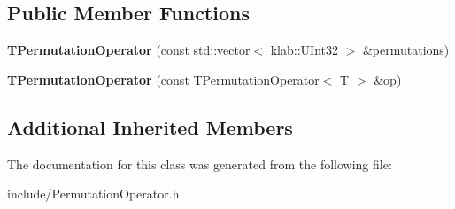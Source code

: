 \subsection*{Public Member Functions}
\begin{DoxyCompactItemize}
\item 
{\bfseries T\+Permutation\+Operator} (const std\+::vector$<$ klab\+::\+U\+Int32 $>$ \&permutations)\hypertarget{classkl1p_1_1TPermutationOperator_a6bd03c0b4d4ed3b6764846d3b71384c3}{}\label{classkl1p_1_1TPermutationOperator_a6bd03c0b4d4ed3b6764846d3b71384c3}

\item 
{\bfseries T\+Permutation\+Operator} (const \hyperlink{classkl1p_1_1TPermutationOperator}{T\+Permutation\+Operator}$<$ T $>$ \&op)\hypertarget{classkl1p_1_1TPermutationOperator_a37b6724c3299c1b5003d079dc1b7a681}{}\label{classkl1p_1_1TPermutationOperator_a37b6724c3299c1b5003d079dc1b7a681}

\end{DoxyCompactItemize}
\subsection*{Additional Inherited Members}


The documentation for this class was generated from the following file\+:\begin{DoxyCompactItemize}
\item 
include/Permutation\+Operator.\+h\end{DoxyCompactItemize}
